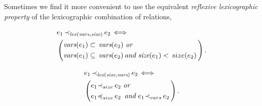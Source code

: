 \documentclass[runningheads]{llncs}
\DeclareMathOperator{\uand}{\emph{and}\,}
\DeclareMathOperator{\uor}{\emph{or}\,}
\DeclareMathOperator{\uiff}{\iff}
\DeclareMathOperator{\lex}{\emph{lex}}
\begin{document}
Sometimes we find it more convenient to use the equivalent \emph{reflexive lexicographic property} of the lexicographic combination of relations,

\begin{alignat*}{2}
  \begin{split}
  &\e{1} \, \expsub{\prec}{\lex(\vars,\size)}\, \e{2}
  \uiff \\
  &\left(\begin{aligned}
  &\vars(\e{1}) \subset \, \vars(\e{2})\, \uor \, \\
  &\vars(\e{1}) \subseteq \, \vars(\e{2}) \uand
 \size(\e{1}) < \, size(\e{2})\,
  \end{aligned}\right).
  \end{split}
  \end{alignat*}


 \begin{alignat*}{2}
  \begin{split}
  &\e{1} \, \expsub{\prec}{\lex(\size, \vars)}\, \e{2}
  \uiff \\
  &\left(\begin{aligned}
  &\e{1} \expsub{\prec}{size}\, \e{2}\, \uor \, \\
  &\e{1} \expsub{\preccurlyeq}{size}\, \e{2}\ \uand
 \e{1} \expsub{\prec}{vars}\, \e{2}\,
  \end{aligned}\right).
  \end{split}
\end{alignat*} 
\begin{comment}
\noindent It is easy to see that the definition implies the reflexive lexicographic property, because $\expsub{g}{1}(\var{x}) = \expsub{g}{1}(\var{y})$ implies $\expsub{g}{1}(\var{x})\, \expsub{\preccurlyeq}{\expsub{w}{1}} \, \expsub{g}{1}(\var{y})$. 
  In the other direction, if the right side of the reflexive lexicographic property holds and the first disjunct $\expsub{g}{1}(\var{x}) \expsub{\prec}{\expsub{w}{1}} \, \expsub{g}{1}(\var{y})$ is true, then  the right side of the definition holds.
  But suppose the right side of the reflexive lexicographic property holds but the first disjunct $\expsub{g}{1}(\var{x}) \expsub{\prec}{\expsub{w}{1}} \, \expsub{g}{1}(\var{y})$ is false;  then the second disjunct \[[\expsub{g}{1}(\var{x}) \expsub{\preccurlyeq}{\expsub{w}{1}} \, \expsub{g}{1}(\var{y}) \uand
  \varsub{x}{2} \expsub{\prec}{\expsub{w}{2}} \, \expsub{g}{2}(\var{y})]\] is true and hence [because $\expsub{g}{1}(\var{x}) \expsub{\prec}{\expsub{w}{1}} \, \expsub{g}{1}(\var{y})$ is false]
  \[ [\expsub{g}{1}(\var{x}) = \expsub{g}{1}(\var{y}) \uand \varsub{x}{2} \expsub{\prec}{\expsub{w}{2}} \, \expsub{g}{2}(\var{y})]. \]
  But that is the right side of the definition.
\end{comment}
\end{document}

